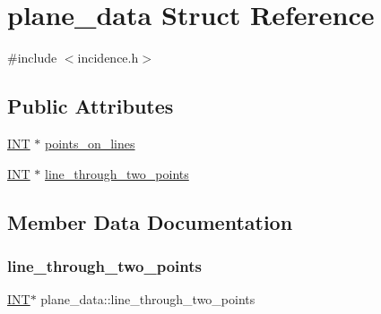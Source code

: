 \hypertarget{structplane__data}{}\section{plane\+\_\+data Struct Reference}
\label{structplane__data}


{\ttfamily \#include $<$incidence.\+h$>$}

\subsection*{Public Attributes}
\begin{DoxyCompactItemize}
\item 
\mbox{\hyperlink{galois_8h_a09fddde158a3a20bd2dcadb609de11dc}{I\+NT}} $\ast$ \mbox{\hyperlink{structplane__data_a0d24e47f583b0be57f56718481b508c7}{points\+\_\+on\+\_\+lines}}
\item 
\mbox{\hyperlink{galois_8h_a09fddde158a3a20bd2dcadb609de11dc}{I\+NT}} $\ast$ \mbox{\hyperlink{structplane__data_ab3a9748aa30b54821ccfdef08d999d10}{line\+\_\+through\+\_\+two\+\_\+points}}
\end{DoxyCompactItemize}


\subsection{Member Data Documentation}
\mbox{\label{structplane__data_ab3a9748aa30b54821ccfdef08d999d10}} 
\subsubsection{\texorpdfstring{line\+\_\+through\+\_\+two\+\_\+points}{line\_through\_two\_points}}
{\footnotesize\ttfamily \mbox{\hyperlink{galois_8h_a09fddde158a3a20bd2dcadb609de11dc}{I\+NT}}$\ast$ plane\+\_\+data\+::line\+\_\+through\+\_\+two\+\_\+points}

\mbox{\label{structplane__data_a0d24e47f583b0be57f56718481b508c7}} 
